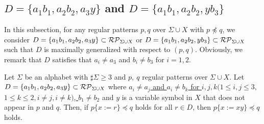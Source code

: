 \subsection{$D = \{ a_{1}b_{1}, a_{2}b_{2}, a_{3}y\}$ and $D = \{ a_{1}b_{1}, a_{2}b_{2}, yb_{3}\}$}\label{subsec:d3b}

{\color{red} In this subsection, for any regular patterns $p,q$ over $\Sigma\cup X$ with $p\not\preceq q$, we consider
$D = \{ a_{1}b_{1}, a_{2}b_{2}, a_{3}y\}\subset \mathcal{RP}_{\Sigma\cup X}$ or $D = \{ a_{1}b_{1}, a_{2}b_{2}, yb_{3}\} \subset \mathcal{RP}_{\Sigma\cup X}$ 
such that $D$ is maximally generalized with respect to $(p,q)$.
Obviously, we remark that $D$ satisfies that $a_{i}\neq a_{3}$ and $b_{i}\neq b_{3}$ for $i=1,2$.
}

\begin{lem}\label{lem:3consts_i}
  Let $\Sigma$ be an alphabet with $\sharp\Sigma \ge 3$ and $p,~q$ regular patterns {\color{red}over} $\Sigma\cup X$.
  {\color{red} Let $D=\{ a_{1}b_{1}, a_{2}b_{2}, a_{3}y\}\subset \mathcal{RP}_{\Sigma\cup X}$
  where \underline{$a_{i}\neq a_{j}$ and $a_{i} \neq b_{k}$ for $i,j,k(1\leq i,j\leq 3,$}\\ \underline{$ 1\leq k\leq 2, i\neq j, i\neq k)$, $b_{1}\neq b_{2}$}
   and $y$ is a variable symbol in $X$ that does not appear in $p$ and $q$.
  Then, if $p \{ x := r \} \preceq q$ holds for all $r \in D$,
then $p \{ x := xy \} \preceq q$ holds.}
\end{lem}

